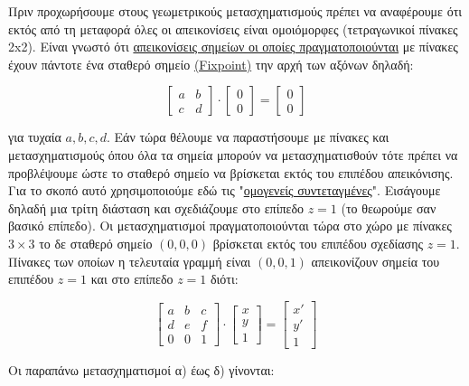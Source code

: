 Πριν προχωρήσουμε στους γεωμετρικούς μετασχηματισμούς πρέπει να αναφέρουμε ότι εκτός από τη μεταφορά όλες οι απεικονίσεις είναι ομοιόμορφες (τετραγωνικοί πίνακες 2x2). Είναι γνωστό ότι \underline{απεικονίσεις σημείων οι οποίες πραγματοποιούνται} με πίνακες έχουν πάντοτε ένα σταθερό σημείο \underline{(Fixpoint)} την αρχή των αξόνων δηλαδή:

\[
\begin{bmatrix} a & b \\ c & d \end{bmatrix} \cdot \begin{bmatrix} 0 \\ 0 \end{bmatrix} = \begin{bmatrix} 0 \\ 0 \end{bmatrix}
\]

 για τυχαία \( a,b,c,d. \) Εάν τώρα θέλουμε να παραστήσουμε με πίνακες και μετασχηματισμούς όπου όλα τα σημεία μπορούν να μετασχηματισθούν τότε πρέπει να προβλέψουμε ώστε το σταθερό σημείο να βρίσκεται εκτός του επιπέδου απεικόνισης. Για το σκοπό αυτό χρησιμοποιούμε εδώ τις "\underline{ομογενείς συντεταγμένες}". Εισάγουμε δηλαδή μια τρίτη διάσταση και σχεδιάζουμε στο επίπεδο \( z=1 \) (το θεωρούμε σαν βασικό επίπεδο). Οι μετασχηματισμοί πραγματοποιούνται τώρα στο χώρο με πίνακες \( 3 \times 3 \) το δε σταθερό σημείο \( (0,0,0) \) βρίσκεται εκτός του επιπέδου σχεδίασης \( z=1 \). Πίνακες των οποίων η τελευταία γραμμή είναι \( (0,0,1) \) απεικονίζουν σημεία του επιπέδου  $z=1$ και στο επίπεδο $z=1$ διότι:

\[
\begin{bmatrix} a & b & c \\ d & e & f \\ 0 & 0 & 1 \end{bmatrix} \cdot \begin{bmatrix} x \\ y \\ 1 \end{bmatrix} = \begin{bmatrix} x' \\ y' \\ 1 \end{bmatrix}
\]

 Οι παραπάνω μετασχηματισμοί α) έως δ) γίνονται:

